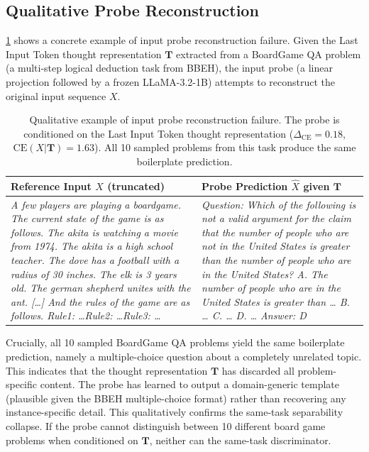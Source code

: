 

\subsection{Qualitative Probe Reconstruction}
\label{appendix:qualitative_probe}

\cref{tab:probe_reconstruction} shows a concrete example of input probe
reconstruction failure. Given the Last Input Token thought representation
$\mathbf{T}$ extracted from a BoardGame QA problem (a multi-step logical deduction
task from BBEH), the input probe (a linear projection followed by a frozen
LLaMA-3.2-1B) attempts to reconstruct the original input sequence $X$.

\begin{table}[h]
\caption{Qualitative example of input probe reconstruction failure.
The probe is conditioned on the Last Input Token thought representation
($\Delta_{\mathrm{CE}} = 0.18$, $\mathrm{CE}(X|\mathbf{T}) = 1.63$).
All 10 sampled problems from this task produce the same boilerplate prediction.}
\label{tab:probe_reconstruction}
\small
\begin{tabular}{p{} p{}}
\toprule
\textbf{Reference Input $X$ (truncated)} & \textbf{Probe Prediction $\hat{X}$ given $\mathbf{T}$} \\
\midrule
\textit{A few players are playing a boardgame. The current state of the game
is as follows. The akita is watching a movie from 1974. The akita is a high
school teacher. The dove has a football with a radius of 30 inches. The elk is
3 years old. The german shepherd unites with the ant. [\ldots] And the rules of
the game are as follows. Rule1: \ldots Rule2: \ldots Rule3: \ldots}
&
\textit{Question: Which of the following is not a valid argument for the claim
that the number of people who are not in the United States is greater than the
number of people who are in the United States?\newline
A. The number of people who are in the United States is greater than \ldots\newline
B. \ldots\newline
C. \ldots\newline
D. \ldots\newline
Answer: D}
\\
\bottomrule
\end{tabular}
\end{table}

Crucially, all 10 sampled BoardGame QA problems yield the same
boilerplate prediction, namely a multiple-choice question about a completely unrelated
topic. This indicates that the thought representation $\mathbf{T}$ has discarded
all problem-specific content. The probe has learned to output a domain-generic
template (plausible given the BBEH multiple-choice format) rather than
recovering any instance-specific detail. This qualitatively confirms the
same-task separability collapse. If the probe cannot distinguish between 10
different board game problems when conditioned on $\mathbf{T}$, neither can
the same-task discriminator.

